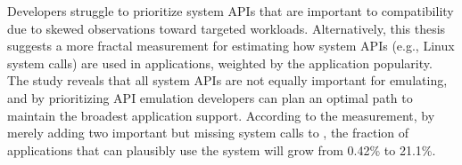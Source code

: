 Developers struggle to prioritize system APIs that are important to compatibility
due to skewed observations toward
targeted workloads.
Alternatively,
this thesis suggests a more fractal measurement
for estimating how system APIs
(e.g., Linux system calls)
are used in applications,
weighted by the application popularity.
The study reveals that all system APIs are not equally important for emulating,
and by prioritizing API emulation
developers can plan an optimal path to maintain the broadest application support.
According to the measurement,
by merely adding two important but missing system calls to \graphene{},
the fraction of applications that can plausibly use the system
will grow from 0.42\% to 21.1\%.



